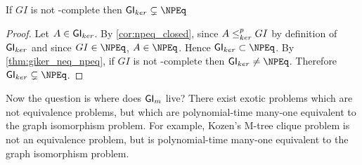 \begin{theorem}If $GI$ is not \NP-complete then
  $\GIker\subsetneq\NPEq$\end{theorem}
\begin{proof}Let $A\in{\ensuremath{\mathsf{GI}}}_{ker}$. By \autoref{cor:npeq_closed}, since $A\leq^{p}_{ker}
  GI$ by definition of ${\mathsf{GI}}_{ker}$ and since $GI\in\NPEq$, $A\in\NPEq$. Hence
  $\GIker\subset\NPEq$. By \autoref{thm:giker_neq_npeq}, if $GI$ is not
  \NP-complete then $\GIker\neq\NPEq$. Therefore
  $\GIker\subsetneq\NPEq$.\end{proof}

Now the question is where does ${\mathsf{GI}}_m$ live? There exist exotic problems which
are not equivalence problems, but which are polynomial-time many-one equivalent
to the graph isomorphism problem. For example, Kozen's M-tree clique problem is
not an equivalence problem, but is polynomial-time many-one equivalent to the
graph isomorphism problem.

